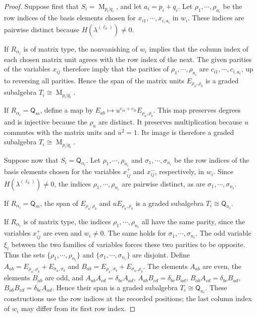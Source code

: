 \documentclass[11pt,reqno]{amsart}
\newcommand{\Mat}{\operatorname{M}}
\newcommand{\Qtype}{\mathsf Q}
\theoremstyle{definition}
\theoremstyle{remark}
\numberwithin{equation}{section}
\begin{document}
\begin{proof}
Suppose first that $S_i=\Mat_{p_i|q_i}$, and let
$a_i=p_i+q_i$.
Let $\rho_1,\cdots,\rho_{a_i}$ be the row indices
of the basis elements chosen for
$x_{i1},\cdots,x_{i,a_i}$ in $w_i$.
These indices are pairwise distinct because
$H(\lambda^{(\ell_0)})\ne0$.

If $R_{\alpha_i}$ is of matrix type, the nonvanishing
of $w_i$ implies that the column index of each chosen
matrix unit agrees with the row index of the next.
The given parities of the variables $x_{ij}$
therefore imply that the parities of
$\rho_1,\cdots,\rho_{a_i}$
are $c_{i1},\cdots,c_{i,a_i}$, up to reversing all parities.
Hence the span of the matrix units $E_{\rho_a,\rho_b}$
is a graded subalgebra $T_i\cong\Mat_{p_i|q_i}$.

If $R_{\alpha_i}=\Qtype_m$, define a map by
$
E_{ab}\longmapsto
u^{c_{ia}+c_{ib}}E_{\rho_a,\rho_b}$.
This map preserves degrees and is injective because
the $\rho_a$ are distinct.
It preserves multiplication because $u$ commutes with
the matrix units and $u^2=1$.
Its image is therefore a graded subalgebra
$T_i\cong\Mat_{p_i|q_i}$.

Suppose now that $S_i=\Qtype_{n_i}$.
Let $\rho_1,\cdots,\rho_{n_i}$ and
$\sigma_1,\cdots,\sigma_{n_i}$ be the row indices
of the basis elements chosen for the variables
$x^+_{ij}$ and $x^-_{ij}$, respectively, in $w_i$. Since 
$H(\lambda^{(\ell_0)})\ne0$, the indices $\rho_1,\cdots,\rho_{n_i}$ are pairwise distinct,
as are $\sigma_1,\cdots,\sigma_{n_i}$.


If $R_{\alpha_i}=\Qtype_m$, the span of
$E_{\rho_a,\rho_b}$ and $uE_{\rho_a,\rho_b}$
is a graded subalgebra $T_i\cong\Qtype_{n_i}$.

If $R_{\alpha_i}$ is of matrix type, the indices
$\rho_1,\cdots,\rho_{n_i}$ all have the same parity,
since the variables $x^+_{ij}$ are even and $w_i\ne0$.
The same holds for $\sigma_1,\cdots,\sigma_{n_i}$.
The odd variable $\xi_i$ between the two families
of variables forces these two parities to be opposite.
Thus the sets $\{\rho_1,\cdots,\rho_{n_i}\}$
and $\{\sigma_1,\cdots,\sigma_{n_i}\}$ are disjoint.
Define $
A_{ab}=E_{\rho_a,\rho_b}+E_{\sigma_a,\sigma_b}$ and $
B_{ab}=E_{\rho_a,\sigma_b}+E_{\sigma_a,\rho_b}$.
The elements $A_{ab}$ are even, the elements $B_{ab}$
are odd, and $
A_{ab}A_{cd}=\delta_{bc}A_{ad}$, $
A_{ab}B_{cd}=\delta_{bc}B_{ad}$,  $ 
B_{ab}A_{cd}=\delta_{bc}B_{ad}$,
$B_{ab}B_{cd}=\delta_{bc}A_{ad}$.
Hence their span is a graded subalgebra
$T_i\cong\Qtype_{n_i}$.
These constructions use the row indices at the recorded
positions; the last column index of $w_i$ may differ
from its first row index.


\end{proof}
\end{document}
